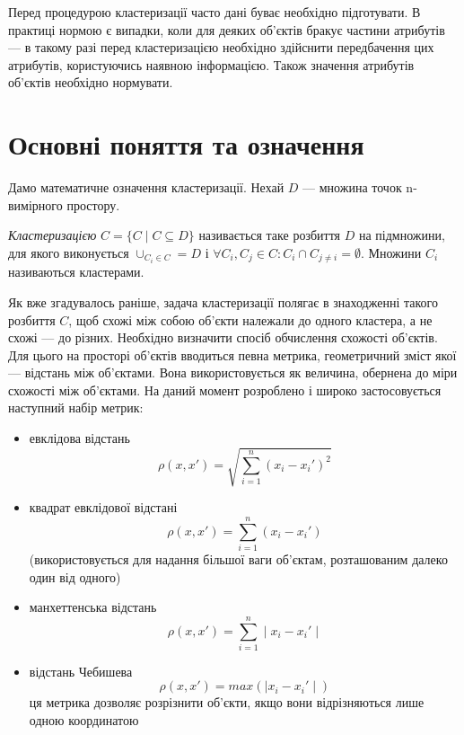    Перед процедурою кластеризації часто дані буває необхідно підготувати. В практиці нормою є випадки, коли для деяких об'єктів бракує частини атрибутів --- в такому разі перед кластеризацією необхідно здійснити передбачення цих атрибутів, користуючись наявною інформацією. Також значення атрибутів об'єктів необхідно нормувати.

\section{Основні поняття та означення}
    Дамо математичне означення кластеризації. Нехай $D$ --- множина точок n-вимірного простору. 
    \begin{definition}
        \emph{Кластеризацією} $C = \{C \mid C \subseteq D\}$ називається таке розбиття $D$ на підмножини, 
        для якого виконується $\cup_{C_i \in C} = D$ і $\forall C_i, C_j \in C : C_i \cap C_{j \neq i} = \emptyset$. 
        Множини $C_i$ називаються кластерами.
    \end{definition}
    Як вже згадувалось раніше, задача кластеризації полягає в знаходженні такого розбиття $C$, щоб схожі між собою об'єкти належали до одного кластера, а не схожі --- до різних. Необхідно визначити спосіб обчислення схожості об'єктів.
    Для цього на просторі об'єктів вводиться певна метрика, геометричний зміст якої --- відстань між об'єктами. Вона використовується як величина, обернена до міри схожості між об'єктами. На даний момент розроблено і широко застосовується наступний набір метрик:
    \begin{itemize}
        \item {евклідова відстань} 
            \begin{equation}
                \rho(x, x') = \sqrt{ \sum_{i=1}^n (x_i - x_i')^2}
            \end{equation}
        \item {квадрат евклідової відстані} 
            \begin{equation}
                \rho(x, x') = \sum_{i=1}^n (x_i - x_i')
            \end{equation}
            (використовується для надання більшої ваги об'єктам, розташованим далеко один від одного)
        \item {манхеттенська відстань} 
            \begin{equation}
                \rho(x, x') = \sum_{i=1}^n \mid x_i - x_i' \mid
            \end{equation}
        \item {відстань Чебишева}
            \begin{equation}
                \rho(x, x') = max(\mid x_i - x_i' \mid )
            \end{equation}            
            ця метрика дозволяє розрізнити об'єкти, якщо вони відрізняються лише одною координатою
    \end{itemize}
    

